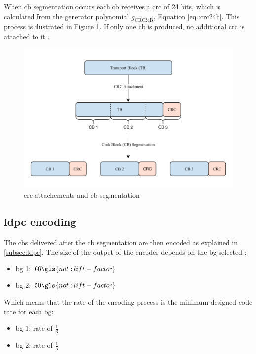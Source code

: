 When \gls{cb} segmentation occurs each \gls{cb} receives a \gls{crc} of 24 bits, which is calculated from the generator polynomial $g_{\mathrm{CRC24B}}$, Equation \eqref{eq.:crc24b}.
%
This process is ilustrated in Figure \ref{fig:cbcrc}.
%
If only one \gls{cb} is produced, no additional \gls{crc} is attached to it \cite{ErikDahlman5G, 3gpp.38.212}.
%


\begin{figure}[htb]
    \includegraphics[width=\columnwidth]{figures/chp_theory/CRC.pdf}
    \caption{\gls{crc} attachements and \gls{cb} segmentation}
    \label{fig:cbcrc}
\end{figure}


\subsection{\gls{ldpc} encoding}

The \glspl{cb} delivered after the \gls{cb} segmentation are then encoded as explained in \ref{subsec:ldpc}.
%
The size of the output of the encoder depends on the \gls{bg} selected \cite{3gpp.38.212}:
%
\begin{itemize}
    \item \gls{bg} 1: $66 \gls{not:lift-factor}$
    \item \gls{bg} 2: $50 \gls{not:lift-factor}$
\end{itemize}
%
Which means that the rate of the encoding process is the minimum designed code rate for each \gls{bg}:
%
\begin{itemize}
    \item \gls{bg} 1: rate of $\frac{1}{3}$
    \item \gls{bg} 2: rate of $\frac{1}{5}$
\end{itemize}

